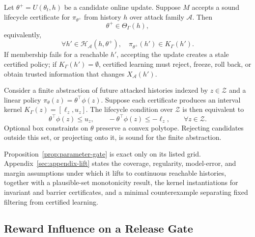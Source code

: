 \begin{theorem}
\label{thm:gate}
Let $\theta^+=U(\theta_t,h)$ be a candidate online update.  Suppose $M$
accepts a sound lifecycle certificate for $\pi_{\theta^+}$ from history $h$
over attack family $\mathcal A$.  Then
\begin{equation}
    \theta^+\in\Theta_\Gamma(h),
\end{equation}
equivalently,
\begin{equation}
    \forall h'\in\mathcal H_{\mathcal A}(h,\theta^+),\quad
    \pi_{\theta^+}(h')\in K_\Gamma(h').
\end{equation}
If membership fails for a reachable $h'$, accepting the update creates a
stale certified policy; if $K_\Gamma(h')=\emptyset$, certified learning must
reject, freeze, roll back, or obtain trusted information that changes
$X_{\mathcal A}(h')$.
\end{theorem}

\begin{proposition}
\label{prop:parameter-gate}
Consider a finite abstraction of future attacked histories indexed by
$z\in\mathcal Z$ and a linear policy
$\pi_\theta(z)=\theta^\top\phi(z)$.  Suppose each certificate produces an
interval kernel $K_\Gamma(z)=[\ell_z,u_z]$.  The lifecycle condition over
$\mathcal Z$ is then equivalent to
\begin{equation}
    \theta^\top\phi(z)\le u_z,\qquad
    -\theta^\top\phi(z)\le -\ell_z,\qquad
    \forall z\in\mathcal Z.
\label{eq:parameter-gate-halfspaces}
\end{equation}
Optional box constraints on $\theta$ preserve a convex polytope.  Rejecting
candidates outside this set, or projecting onto it, is sound for the finite
abstraction.
\end{proposition}

Proposition~\ref{prop:parameter-gate} is exact only on its listed grid.
Appendix~\ref{sec:appendix-lift} states the coverage, regularity, model-error,
and margin assumptions under which it lifts to continuous reachable histories,
together with a plausible-set monotonicity result, the kernel instantiations
for invariant and barrier certificates, and a minimal counterexample
separating fixed filtering from certified learning.

\subsection{Reward Influence on a Release Gate}
\label{sec:reward-geometry}

